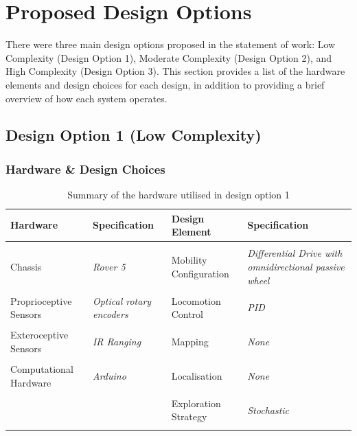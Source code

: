 \documentclass[a4paper]{article}
\begin{document}
\section{Proposed Design Options}
There were three main design options proposed in the statement of work: Low Complexity (Design Option 1), Moderate Complexity (Design Option 2), and High Complexity (Design Option 3). This section provides a list of the hardware elements and design choices for each design, in addition to providing a brief overview of how each system operates.
\subsection{Design Option 1 (Low Complexity)}
\subsubsection{Hardware \& Design Choices}
\begin{table}[h]
\centering
\caption{Summary of the hardware utilised in design option 1}\footnotesize
\begin{tabular}{p{3.5cm}p{3.8cm}p{3.5cm}p{3.8cm}}
\toprule
\textbf{Hardware} & \textbf{Specification} & \textbf{Design Element} & \textbf{Specification}\\
\midrule
& & &\\
Chassis  & \textit{Rover 5} & Mobility Configuration & \textit{Differential Drive with omnidirectional passive wheel}\\
& & &\\
Proprioceptive Sensors & \textit{Optical rotary encoders} & Locomotion Control & \textit{PID}\\
& & &\\
Exteroceptive Sensors & \textit{IR Ranging} & Mapping & \textit{None}\\
& & & \\
Computational Hardware & \textit{Arduino} & Localisation & \textit{None}\\
& & & \\
 & & Exploration Strategy & \textit{Stochastic}\\
& & & \\
\bottomrule
\end{tabular}
\end{table}
\end{document}
